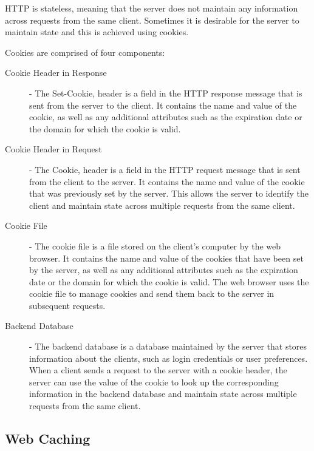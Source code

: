\documentclass[12pt letter]{report}
\begin{document}

HTTP is stateless, meaning that the server does not maintain any
information across requests from the same client. Sometimes it is
desirable for the server to maintain state and this is achieved using cookies.

Cookies are comprised of four components:
\begin{description}
  \item[Cookie Header in Response] - The Set-Cookie, header is a field in
    the HTTP response
    message that is sent from the server to the client. It contains
    the name and value of the cookie, as well as any additional
    attributes such as the expiration date or the domain for which the
    cookie is valid.
  \item[Cookie Header in Request] - The Cookie, header is a field in
    the HTTP request message that is sent from the client to the
    server. It contains the name and value of the cookie that was
    previously set by the server. This allows the server to identify
    the client and maintain state across multiple requests from the same client.
  \item[Cookie File] - The cookie file is a file stored on the
    client's computer by the web browser. It contains the name and
    value of the cookies that have been set by the server, as well as
    any additional attributes such as the expiration date or the
    domain for which the cookie is valid. The web browser uses the
    cookie file to manage cookies and send them back to the server in
    subsequent requests.
  \item[Backend Database] - The backend database is a database maintained by the
    server that stores information about the clients, such as login
    credentials or user preferences. When a client sends a request to
    the server with a cookie header, the server can use the value of
    the cookie to look up the corresponding information in the backend
    database and maintain state across multiple requests from the same client.
\end{description}

\subsection{Web Caching}
\end{document}
